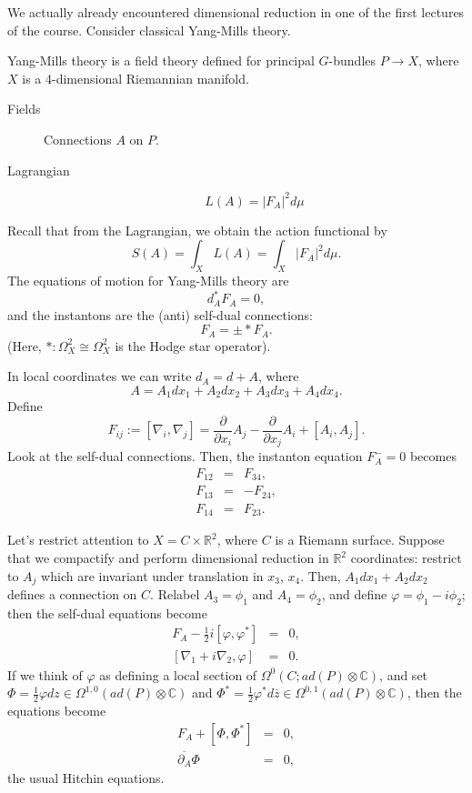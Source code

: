 \begin{example*}
 We actually already encountered dimensional reduction
in one of the first lectures of the course. Consider classical Yang-Mills
theory.

Yang-Mills theory is a field theory defined for principal $G$-bundles
$P\rightarrow X$, where $X$ is a 4-dimensional Riemannian manifold.
\begin{description}
\item [{Fields}] Connections $A$ on $P$.
\item [{Lagrangian}]
\[
L\left(A\right)=\left|F_{A}\right|^{2}d\mu
\]

\end{description}
Recall that from the Lagrangian, we obtain the action functional by
\[
S\left(A\right)=\int_{X}L\left(A\right)=\int_{X}\left|F_{A}\right|^{2}d\mu.
\]
The equations of motion for Yang-Mills theory are
\[
d_{A}^{*}F_{A}=0,
\]
and the instantons are the (anti) self-dual connections:
\[
F_{A}=\pm*F_{A}.
\]
(Here, $*:\Omega_{X}^{2}\cong\Omega_{X}^{2}$ is the Hodge star operator).

In local coordinates we can write $d_{A}=d+A$, where
\[
A=A_{1}dx_{1}+A_{2}dx_{2}+A_{3}dx_{3}+A_{4}dx_{4}.
\]
Define
\[
F_{ij}:=\left[\nabla_{i},\nabla_{j}\right]=\frac{\partial}{\partial x_{i}}A_{j}-\frac{\partial}{\partial x_{j}}A_{i}+\left[A_{i},A_{j}\right].
\]
Look at the self-dual connections. Then, the instanton equation $F_{A}^{-}=0$
becomes
\begin{eqnarray*}
F_{12} & = & F_{34},\\
F_{13} & = & -F_{24},\\
F_{14} & = & F_{23}.
\end{eqnarray*}


Let's restrict attention to $X=C\times\mathbb{R}^{2}$, where $C$
is a Riemann surface. Suppose that we compactify and perform dimensional
reduction in $\mathbb{R}^{2}$ coordinates: restrict to $A_{j}$ which
are invariant under translation in $x_{3}$, $x_{4}$. Then, $A_{1}dx_{1}+A_{2}dx_{2}$
defines a connection on $C$. Relabel $A_{3}=\phi_{1}$ and $A_{4}=\phi_{2}$,
and define $\varphi=\phi_{1}-i\phi_{2}$; then the self-dual equations
become
\begin{eqnarray*}
F_{A}-\frac{1}{2}i\left[\varphi,\varphi^{*}\right] & = & 0,\\
\left[\nabla_{1}+i\nabla_{2},\varphi\right] & = & 0.
\end{eqnarray*}
If we think of $\varphi$ as defining a local section of $\Omega^{0}\left(C;ad(P)\otimes\mathbb{C}\right)$,
and set $\Phi=\frac{1}{2}\varphi dz\in\Omega^{1,0}\left(ad\left(P\right)\otimes\mathbb{C}\right)$
and $\Phi^{*}=\frac{1}{2}\varphi^{*}d\overline{z}\in\Omega^{0,1}\left(ad(P)\otimes\mathbb{C}\right)$,
then the equations become
\begin{eqnarray*}
F_{A}+\left[\Phi,\Phi^{*}\right] & = & 0,\\
\overline{\partial_{A}}\Phi & = & 0,
\end{eqnarray*}
the usual Hitchin equations.
\end{example*}

